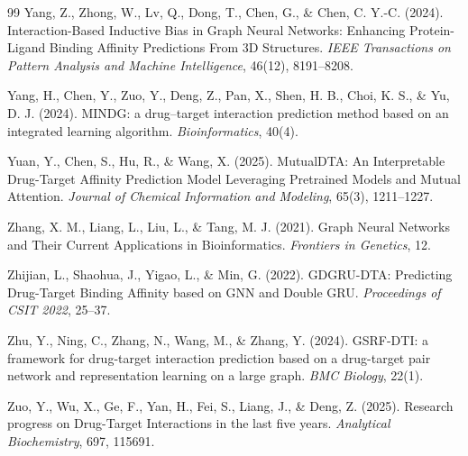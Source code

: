 \documentclass[12pt,a4paper,oneside]{report}
\begin{document}
\begin{thebibliography}{99}
Yang, Z., Zhong, W., Lv, Q., Dong, T., Chen, G., \& Chen, C. Y.-C. (2024).
Interaction-Based Inductive Bias in Graph Neural Networks: Enhancing Protein-Ligand Binding Affinity Predictions From 3D Structures.
\textit{IEEE Transactions on Pattern Analysis and Machine Intelligence}, 46(12), 8191--8208.

Yang, H., Chen, Y., Zuo, Y., Deng, Z., Pan, X., Shen, H. B., Choi, K. S., \& Yu, D. J. (2024).
MINDG: a drug–target interaction prediction method based on an integrated learning algorithm.
\textit{Bioinformatics}, 40(4).

Yuan, Y., Chen, S., Hu, R., \& Wang, X. (2025).
MutualDTA: An Interpretable Drug-Target Affinity Prediction Model Leveraging Pretrained Models and Mutual Attention.
\textit{Journal of Chemical Information and Modeling}, 65(3), 1211--1227.

Zhang, X. M., Liang, L., Liu, L., \& Tang, M. J. (2021).
Graph Neural Networks and Their Current Applications in Bioinformatics.
\textit{Frontiers in Genetics}, 12.

Zhijian, L., Shaohua, J., Yigao, L., \& Min, G. (2022).
GDGRU-DTA: Predicting Drug-Target Binding Affinity based on GNN and Double GRU.
\textit{Proceedings of CSIT 2022}, 25--37.

Zhu, Y., Ning, C., Zhang, N., Wang, M., \& Zhang, Y. (2024).
GSRF-DTI: a framework for drug-target interaction prediction based on a drug-target pair network and representation learning on a large graph.
\textit{BMC Biology}, 22(1).

Zuo, Y., Wu, X., Ge, F., Yan, H., Fei, S., Liang, J., \& Deng, Z. (2025).
Research progress on Drug-Target Interactions in the last five years.
\textit{Analytical Biochemistry}, 697, 115691.

\end{thebibliography}
\end{document}
